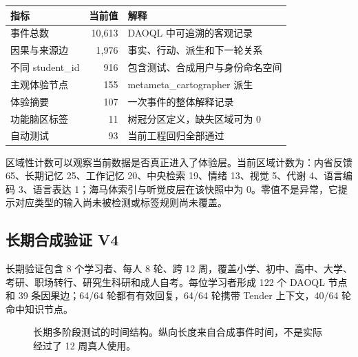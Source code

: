 \documentclass[UTF8,a4paper,11pt]{ctexart}
\begin{document}
\begin{center}
\begin{longtable}{@{}p{5.0cm}r p{5.5cm}@{}}
\toprule
\textbf{指标} & \textbf{当前值} & \textbf{解释} \\
\midrule
事件总数 & 10,613 & DAOQL 中可追溯的客观记录 \\
因果与来源边 & 1,976 & 事实、行动、派生和下一轮关系 \\
不同 student\_id & 916 & 包含测试、合成用户与身份命名空间 \\
主观体验节点 & 155 & metameta\_cartographer 派生 \\
体验摘要 & 107 & 一次事件的整体解释记录 \\
功能脑区标签 & 11 & 树冠分区定义，缺失区域可为 0 \\
自动测试 & 93 & 当前工程回归全部通过 \\
\bottomrule
\end{longtable}
\end{center}

区域性计数可以观察当前数据是否真正进入了体验层。当前区域计数为：内省反馈 65、长期记忆 25、工作记忆 20、中央检索 19、情绪 13、视觉 5、代谢 4、语言编码 3、语言表达 1；海马体索引与听觉皮层在该快照中为 0。零值不是异常，它提示对应类型的输入尚未被检测或标签规则尚未覆盖。

\subsection{长期合成验证 V4}

长期验证包含 8 个学习者、每人 8 轮、跨 12 周，覆盖小学、初中、高中、大学、考研、职场转行、研究生科研和成人自考。每位学习者形成 122 个 DAOQL 节点和 39 条因果边；64/64 轮都有有效回复，64/64 轮携带 Tender 上下文，40/64 轮命中知识节点。

\begin{figure}[htbp]
\centering
{}
\caption{长期多阶段测试的时间结构。纵向长度来自合成事件时间，不是实际经过了 12 周真人使用。}
\end{figure}
\end{document}

